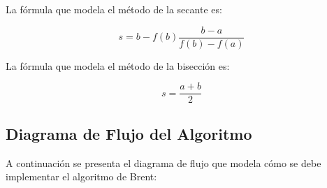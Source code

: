 \documentclass[a4paper,12pt]{article}
\begin{document}
La fórmula que modela el método de la secante es: \par 

\[ s = b - f(b)\frac{b - a}{f(b) - f(a)} \]

La fórmula que modela el método de la bisección es: \par 

\[ s = \frac{a + b}{2} \]

\newpage

\subsection{Diagrama de Flujo del Algoritmo}

A continuación se presenta el diagrama de flujo que modela cómo se debe implementar el algoritmo de Brent: \par 

\vspace{1em}
\end{document}
